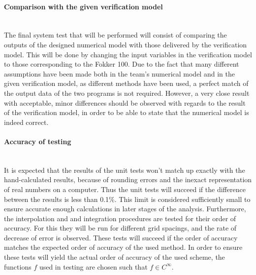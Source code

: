 \paragraph{Comparison with the given verification model}\mbox{}\\
\noindent The final system test that will be performed will consist of comparing the outputs of the designed numerical model with those delivered by the verification model. This will be done by changing the input variables in the verification model to those corresponding to the Fokker 100. Due to the fact that many different assumptions have been made both in the team's numerical model and in the given verification model, as different methods have been used, a perfect match of the output data of the two programs is not required. However, a very close result with acceptable, minor differences should be observed with regards to the result of the verification model, in order to be able to state that the numerical model is indeed correct. 


\paragraph{Accuracy of testing}\mbox{}\\
\noindent It is expected that the results of the unit tests won't match up exactly with the hand-calculated results, because of rounding errors and the inexact representation of real numbers on a computer. Thus the unit tests will succeed if the difference between the results is less than 0.1\%. This limit is considered sufficiently small to ensure accurate enough calculations in later stages of the analysis. Furthermore, the interpolation and and integration procedures are tested for their order of accuracy. For this they will be run for different grid spacings, and the rate of decrease of error is observed. These tests will succeed if the order of accuracy matches the expected order of accuracy of the used method. In order to ensure these tests will yield the actual order of accuracy of the used scheme, the functions $f$ used in testing are chosen such that $f \in C^{\infty}$. 


